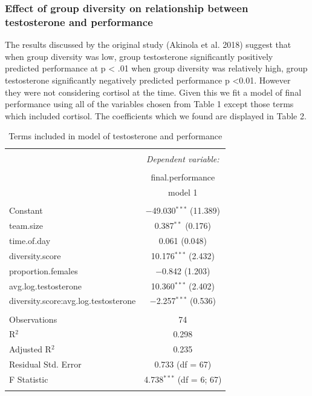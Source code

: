 \documentclass[]{article}
\begin{document}
\subsubsection{Effect of group diversity on relationship between
testosterone and
performance}\label{effect-of-group-diversity-on-relationship-between-testosterone-and-performance}

The results discussed by the original study (Akinola et al. 2018)
suggest that when group diversity was low, group testosterone
significantly positively predicted performance at p \textless{} .01 when
group diversity was relatively high, group testosterone significantly
negatively predicted performance p \textless{}0.01. However they were
not considering cortisol at the time. Given this we fit a model of final
performance using all of the variables chosen from Table 1 except those
terms which included cortisol. The coefficients which we found are
displayed in Table 2.

\begin{table}[!htbp] \centering 
  \caption{Terms included in model of testosterone and performance} 
  \label{tab:regression} 
\small 
\begin{tabular}{@{\extracolsep{1pt}}lc} 
\\[-1.8ex]\hline 
\hline \\[-1.8ex] 
 & \multicolumn{1}{c}{\textit{Dependent variable:}} \\ 
\cline{2-2} 
\\[-1.8ex] & final.performance \\ 
 & model 1 \\ 
\hline \\[-1.8ex] 
 Constant & $-$49.030$^{***}$ (11.389) \\ 
  team.size & 0.387$^{**}$ (0.176) \\ 
  time.of.day & 0.061 (0.048) \\ 
  diversity.score & 10.176$^{***}$ (2.432) \\ 
  proportion.females & $-$0.842 (1.203) \\ 
  avg.log.testosterone & 10.360$^{***}$ (2.402) \\ 
  diversity.score:avg.log.testosterone & $-$2.257$^{***}$ (0.536) \\ 
 \hline \\[-1.8ex] 
Observations & 74 \\ 
R$^{2}$ & 0.298 \\ 
Adjusted R$^{2}$ & 0.235 \\ 
Residual Std. Error & 0.733 (df = 67) \\ 
F Statistic & 4.738$^{***}$ (df = 6; 67) \\ 
\hline 
\hline \\[-1.8ex] 
\end{tabular} 
\end{table}
\end{document}
